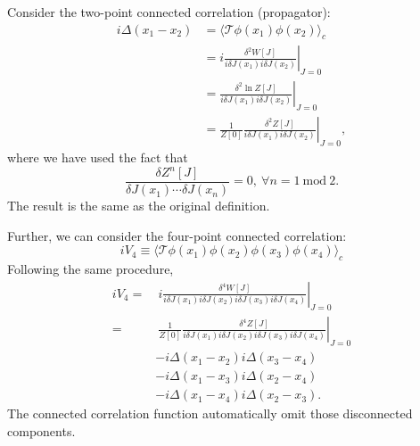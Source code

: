 Consider the two-point connected correlation (propagator):
\begin{equation}
\begin{aligned}
	i\Delta(x_1-x_2)
	&= \langle \mathcal{T}\phi(x_1) \phi(x_2)\rangle_c \\
	&= i\left.\frac{\delta^2 W[J]}{i\delta J(x_1) i\delta J(x_2)}\right|_{J=0} \\
	&= \left.\frac{\delta^2 \ln Z[J]}{i\delta J(x_1) i\delta J(x_2)}\right|_{J=0}\\
	&= \frac{1}{Z[0]}\left.\frac{\delta^2 Z[J]}{i\delta J(x_1)i\delta J(x_2)}\right|_{J=0},
\end{aligned}
\end{equation}
where we have used the fact that
\begin{equation}
	\frac{\delta Z^n[J]}{\delta J(x_1) \cdots \delta J(x_n)} = 0,\ \forall n = 1\ \mathrm{mod}\ 2.
\end{equation}
The result is the same as the original definition.

Further, we can consider the four-point connected correlation:
\begin{equation}
	iV_4 \equiv \langle \mathcal{T}\phi(x_1) \phi(x_2) \phi(x_3) \phi(x_4)\rangle_c
\end{equation}
Following the same procedure,
\begin{equation}
\begin{aligned}
	iV_4 
	=&\ i\left.\frac{\delta^4 W[J]}{i\delta J(x_1)i\delta J(x_2)i\delta J(x_3)i\delta J(x_4)}\right|_{J=0} \\
	=&\ \frac{1}{Z[0]}\left.\frac{\delta^4 Z[J]}{i\delta J(x_1)i\delta J(x_2)i\delta J(x_3)i\delta J(x_4)}\right|_{J=0} \\
	& -i\Delta(x_1-x_2) i\Delta(x_3-x_4) \\
	& -i\Delta(x_1-x_3) i\Delta(x_2-x_4) \\
	& -i\Delta(x_1-x_4) i\Delta(x_2-x_3).
\end{aligned}
\end{equation}
The connected correlation function automatically omit those disconnected components.


